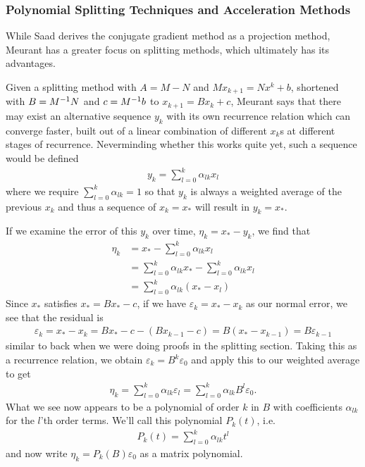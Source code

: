 \documentclass[11pt]{article}
\begin{document}
\subsubsection{Polynomial Splitting Techniques and Acceleration Methods}

While Saad derives the conjugate gradient method as a projection method, Meurant has a greater focus on splitting methods, which ultimately has its advantages.

Given a splitting method with $A = M - N$ and $M x_{k+1} = N x^k + b$, shortened with $B = M^{-1} N$ and $c = M^{-1} b$ to $x_{k+1} = Bx_k + c$, Meurant says that there may exist an alternative sequence $y_k$ with its own recurrence relation which can converge faster, built out of a linear combination of different $x_k$s at different stages of recurrence. Neverminding whether this works quite yet, such a sequence would be defined \begin{gather*}
y_k = \sum_{l=0}^k \alpha_{lk} x_l
\end{gather*}
where we require $\sum_{l=0}^k \alpha_{lk} = 1$ so that $y_k$ is always a weighted average of the previous $x_k$ and thus a sequence of $x_k = x_*$ will result in $y_k = x_*$.

If we examine the error of this $y_k$ over time, $\eta_k = x_* - y_k$, we find that \begin{align*}
\eta_k &= x_* - \sum_{l=0}^k \alpha_{lk} x_l \\
&= \sum_{l=0}^k \alpha_{lk} x_* - \sum_{l=0}^k \alpha_{lk} x_l \\
&= \sum_{l=0}^k \alpha_{lk} (x_* - x_l)
\end{align*}
Since $x_*$ satisfies $x_* = B x_* - c$, if we have $\varepsilon_k = x_* - x_k$ as our normal error, we see that the residual is \begin{gather*}
\varepsilon_k = x_* - x_k = Bx_* - c - (Bx_{k-1} - c) = B(x_* - x_{k-1}) = B \varepsilon_{k-1}
\end{gather*}
similar to back when we were doing proofs in the splitting section. Taking this as a recurrence relation, we obtain $\varepsilon_k = B^k \varepsilon_0$ and apply this to our weighted average to get \begin{gather*}
\eta_k = \sum_{l=0}^k \alpha_{lk} \varepsilon_l = \sum_{l=0}^k \alpha_{lk} B^l  \varepsilon_0.
\end{gather*}
What we see now appears to be a polynomial of order $k$ in $B$ with coefficients $\alpha_{lk}$ for the $l$'th order terms. We'll call this polynomial $P_k(t)$, i.e. \begin{gather*}
P_k(t) = \sum_{l=0}^k \alpha_{lk} t^l
\end{gather*}
and now write $\eta_k = P_k(B)\varepsilon_0$ as a matrix polynomial.
\end{document}
